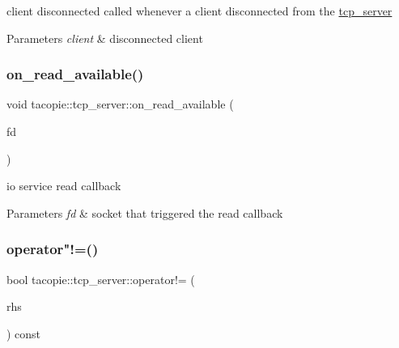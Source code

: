 client disconnected called whenever a client disconnected from the \hyperlink{classtacopie_1_1tcp__server}{tcp\+\_\+server}


\begin{DoxyParams}{Parameters}
{\em client} & disconnected client \\
\hline
\end{DoxyParams}
\mbox{\label{classtacopie_1_1tcp__server_a62b4b67ab9554b27881be8dbe869cc6e}} 
\subsubsection{\texorpdfstring{on\+\_\+read\+\_\+available()}{on\_read\_available()}}
{\footnotesize\ttfamily void tacopie\+::tcp\+\_\+server\+::on\+\_\+read\+\_\+available (\begin{DoxyParamCaption}\item[{\hyperlink{namespacetacopie_acce7ad26b2d30156b1e6fa353f727026}{fd\+\_\+t}}]{fd }\end{DoxyParamCaption})\hspace{0.3cm}{\ttfamily [private]}}

io service read callback


\begin{DoxyParams}{Parameters}
{\em fd} & socket that triggered the read callback \\
\hline
\end{DoxyParams}
\mbox{\label{classtacopie_1_1tcp__server_aa45611b77d60b536aeaf626d1724342d}} 
\subsubsection{\texorpdfstring{operator"!=()}{operator!=()}}
{\footnotesize\ttfamily bool tacopie\+::tcp\+\_\+server\+::operator!= (\begin{DoxyParamCaption}\item[{const \hyperlink{classtacopie_1_1tcp__server}{tcp\+\_\+server} \&}]{rhs }\end{DoxyParamCaption}) const}

